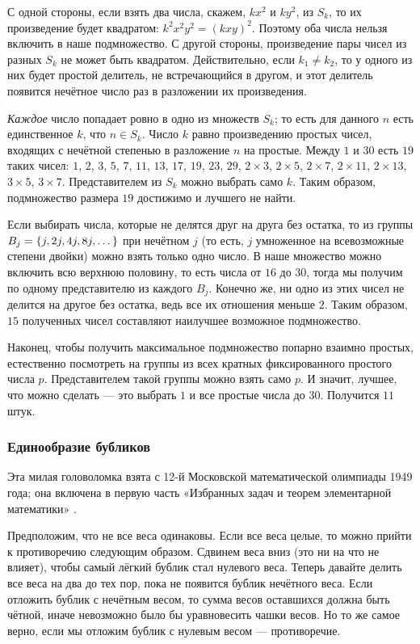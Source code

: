 С одной стороны, если взять два числа, скажем, $kx^2$ и $ky^2$, из $S_k$, то их произведение будет квадратом: $k^2x^2y^2 = (kxy)^2$.
Поэтому оба числа нельзя включить в наше подмножество.
С другой стороны, произведение пары чисел из разных $S_k$ не может быть квадратом.
Действительно, если $k_1\ne k_2$, то у одного из них будет простой делитель, не встречающийся в другом, и этот делитель появится нечётное число раз в разложении их произведения.

\emph{Каждое} число попадает ровно в одно из множеств $S_k$;
то есть для данного $n$ есть единственное $k$, что $n \in S_k$.
Число $k$ равно произведению простых чисел, входящих с нечётной степенью в разложение $n$ на простые.
Между $1$ и $30$ есть $19$ таких чисел: $1$, $2$, $3$, $5$, $7$, $11$, $13$, $17$, $19$,
$23$, $29$, $2 \times 3$, $2 \times 5$, $2 \times 7$, $2 \times 11$, $2 \times 13$, $3 \times 5$, $3 \times 7$.
Представителем из $S_k$ можно выбрать само $k$.
Таким образом, подмножество размера $19$ достижимо и лучшего не найти.

Если выбирать числа, которые не делятся друг на друга без остатка, то из группы $B_j \z= \{j, 2j, 4j, 8j, \dots\}$ при нечётном $j$ (то есть, $j$ умноженное на всевозможные степени двойки) можно взять только одно число.
В наше множество можно включить всю верхнюю половину, то есть числа от $16$ до $30$, тогда мы получим по одному представителю из каждого $B_j$.
Конечно же, ни одно из этих чисел не делится на другое без остатка, ведь все их отношения меньше $2$.
Таким образом, $15$ полученных чисел составляют наилучшее возможное подмножество.

Наконец, чтобы получить максимальное подмножество попарно взаимно простых, естественно посмотреть на группы из всех кратных фиксированного простого числа $p$.
Представителем такой группы можно взять само $p$. 
И значит, лучшее, что можно сделать — это выбрать $1$ и все простые числа до $30$.
Получится $11$ штук.

\subsubsection*{Единообразие бубликов}

Эта милая головоломка взята с 12-й Московской математической олимпиады 1949 года;
она включена в первую часть «Избранных задач и теорем элементарной математики» %
\cite[задача 127, стр. 28]{51}.

Предположим, что не все веса одинаковы.
Если все веса целые, то можно прийти к противоречию следующим образом.
Сдвинем веса вниз (это ни на что не влияет), чтобы самый лёгкий бублик стал нулевого веса.
Теперь давайте делить все веса на два до тех пор, пока не появится бублик нечётного веса.
Если отложить бублик с нечётным весом, то сумма весов оставшихся должна быть чётной, иначе невозможно было бы уравновесить чашки весов.
Но то же самое верно, если мы отложим бублик с нулевым весом --- противоречие.


